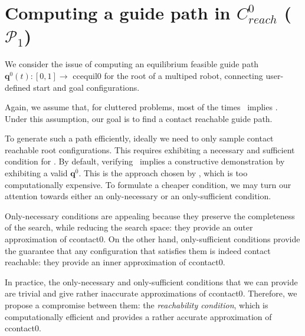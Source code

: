 \section{Computing a guide path in $C^0_{reach}$ ($\mathcal{P}_1$) }
\label{rbprm}

We consider the issue of computing an \gls{equilibrium feasible} guide path $\mathbf{q}^0(t) : [0,1] \longrightarrow$ \gls{ccequil0} for the root of a multiped robot, connecting user-defined start and goal configurations.

Again, we assume that, for \gls{cluttered} problems, most of the times \contactreachability\, implies \equilibriumfeasibility.
Under this assumption, our goal is to find a \gls{contact reachable} guide path.

To generate such a path efficiently, ideally we need to only sample \gls{contact reachable} root configurations.
This requires exhibiting a necessary and sufficient condition for \contactreachability. %
By default, verifying \contactreachability\, implies a constructive demonstration by exhibiting a valid $\mathbf{q}^{\overline{0}}$. This is the approach chosen by \cite{Bouyarmane2009},
which is too computationally expensive.
To formulate a cheaper condition, we may turn our attention towards either an only-necessary or an only-sufficient condition.

Only-necessary conditions are appealing because they preserve the completeness of the search, while reducing 
the search space: they provide an outer approximation of \gls{ccontact0}.
On the other hand, only-sufficient conditions provide the guarantee that any configuration that satisfies them is indeed \gls{contact reachable}:
they provide an inner approximation of \gls{ccontact0}.

In practice, the only-necessary and only-sufficient conditions that we can provide are trivial and give rather inaccurate approximations of \gls{ccontact0}.
Therefore, we propose a compromise between them: the \textit{reachability condition}, which is computationally efficient
and provides a rather accurate approximation of \gls{ccontact0}. %



